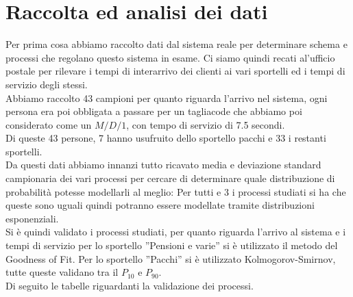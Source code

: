 \documentclass{article}
\begin{document}

\section{Raccolta ed analisi dei dati}
Per prima cosa abbiamo raccolto dati dal sistema reale per determinare schema e processi che regolano questo sistema in esame. Ci siamo quindi recati al'ufficio postale per rilevare i tempi di interarrivo dei clienti ai vari sportelli ed i tempi di servizio degli stessi.\\
Abbiamo raccolto 43 campioni per quanto riguarda l'arrivo nel sistema, ogni persona era poi obbligata a passare per un tagliacode che abbiamo poi considerato come un $M/D/1$, con tempo di servizio di 7.5 secondi.\\
Di queste 43 persone, 7 hanno usufruito dello sportello pacchi e 33 i restanti sportelli.\\
Da questi dati abbiamo innanzi tutto ricavato media e deviazione standard campionaria dei vari processi per cercare di determinare quale distribuzione di probabilità potesse modellarli al meglio:
Per tutti e 3 i processi studiati si ha che queste sono uguali quindi potranno essere modellate tramite distribuzioni esponenziali.\\
Si è quindi validato i processi studiati, per quanto riguarda l'arrivo al sistema e i tempi di servizio per lo sportello ''Pensioni e varie'' si è utilizzato il metodo del Goodness of Fit. Per lo sportello ''Pacchi'' si è utilizzato Kolmogorov-Smirnov, tutte queste validano tra il $P_{10}$ e $P_{90}$.\\
Di seguito le tabelle riguardanti la validazione dei processi.\\
\end{document}
